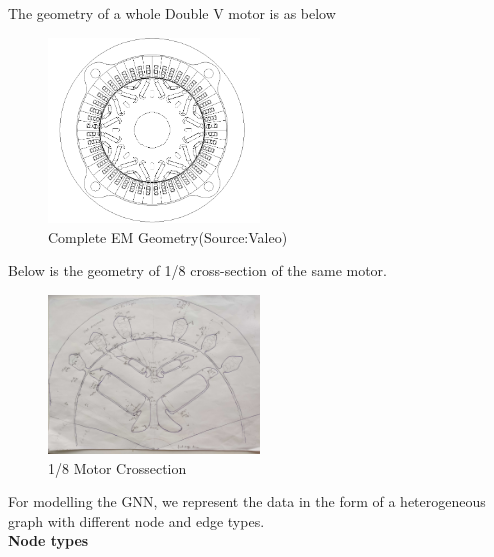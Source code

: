 \documentclass{report} %
\begin{document}
The geometry of a whole Double V motor is as below

\begin{figure}[h]
    \centering
    \includegraphics[width=0.5\textwidth]{./ReportImages/FullMotorv2.png} 
    \caption{Complete EM Geometry(Source:Valeo)}
    \label{fig:Full Motor}
\end{figure}

Below is the geometry of 1/8 cross-section of the same motor.

\begin{figure}[h]
    \centering
    \includegraphics[width=0.5\textwidth]{./ReportImages/EMCrosssection.jpg} 
    \caption{1/8 Motor Crossection}
    \label{fig:1/8 Motor Crossection}
\end{figure}

\newpage 

For modelling the GNN, we represent the data in the form of a heterogeneous graph with different node and edge types.\\



\textbf{Node types}
\end{document}
